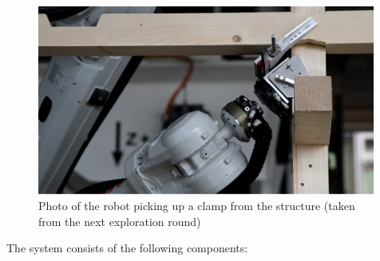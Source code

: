 \begin{figure}[!h]
    \centering
    \includegraphics[width=0.99\textwidth]{images/7a/img72.png}
    \caption[Photo of the robot picking up a clamp from the structure]{Photo of the robot picking up a clamp from the structure (taken from the next exploration round)}
    \label{fig:robot-picking-up-a-clamp-from-the-structure}
\end{figure}

The system consists of the following components:

